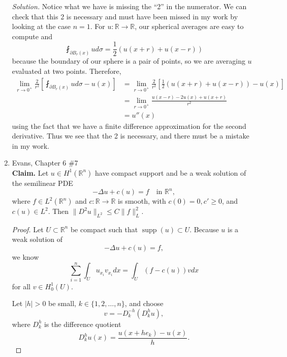 \documentclass[a4paper]{article}
\newenvironment{solution}{\emph{Solution.}}{}
\newenvironment{claim}{\textbf{Claim.}}{}
\newcommand{\R}{\mathbb{R}}
\newcommand{\supp}[1]{\mathop{\mathrm{supp}}\left(#1\right)}
\begin{document}
\begin{enumerate}
\begin{solution}
      Notice what we have is missing the ``2'' in the numerator. We can check that this 2 is necessary and must have been missed in my work by looking
      at the case $n=1$. For $u: \R \to \R$, our spherical averages are easy to compute and
      \[ \fint_{\partial B_r(x)}^{} u d \sigma = \frac{1}{2} ( u(x+r) + u(x-r) ) \]
      because the boundary of our sphere is a pair of points, so we are averaging $u$ evaluated at two points.
      Therefore,
      \begin{align*}
        \lim_{r \to 0^+} \frac{2}{r^2} \left[ \fint_{\partial B_r(x)}^{} u d\sigma - u(x) \right]
        &= \lim_{r \to 0^+} \frac{2}{r^2} \left[ \frac{1}{2} \left( u(x+r) + u(x-r) \right) - u(x) \right] \\
        &= \lim_{r \to 0^+} \frac{u(x-r) - 2u(x) + u(x+r)}{r^2} \\
        &= u''(x)
      \end{align*}
      using the fact that we have a finite difference approximation for the second derivative. Thus we see that the 2 is necessary, and there must be
      a mistake in my work.

    \end{solution}

  \item Evans, Chapter 6 \#7 \\
    \begin{claim}
      Let $u \in H^1(\R^n)$ have compact support and be a weak solution of the semilinear PDE
      \[ - \Delta u + c(u) = f \quad \text{in } \R^n ,\]
      where $f \in L^2(\R^n)$ and $c: \R \to \R$ is smooth, with $c(0) = 0, c' \geq 0$, and $c(u) \in L^2$. Then $\|D^2 u \|_{L^2} \leq C \|f\|_L^2$.
    \end{claim}

    \begin{proof}
      Let $U \subset \R^n$ be compact such that $\supp{u} \subset U$. Because $u$ is a weak solution of
      \[ -\Delta u + c(u) = f ,\]
      we know
      \[ \sum_{i = 1}^n \int_{U}^{} u_{x_i} v_{x_i} dx = \int_{U}^{} (f - c(u)) v dx \]
      for all $v \in H_0^1(U)$.

      Let $|h| > 0$ be small, $k \in \{1,2,\dots,n\}$, and choose
      \[ v = -D_k^{-h} (D_k^h u) ,\]
      where $D_k^h$ is the difference quotient
      \[ D_k^h u(x) = \frac{u(x + h e_k) - u(x)}{h} .\]


\end{proof}
\end{enumerate}
\end{document}
